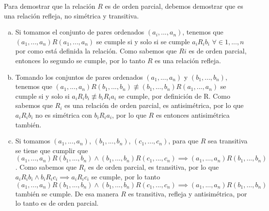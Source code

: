 
Para demostrar que la relación $R$ es de orden parcial, debemos demostrar que es una relación refleja, no simétrica y transitiva.

\begin{enumerate}[a)]
    \item Si tomamos el conjunto de pares ordenados $(a_i,...,a_n)$, tenemos que $(a_1,...,a_n)R(a_1,...,a_n)$ se cumple si y solo si se cumple $a_iR_ib_i$ $\forall \in 1,...,n $ por como está definida la relación. Como sabemos que $Ri$ es de orden parcial, entonces lo segundo se cumple, por lo tanto $R$ es una relación refleja.
    
    \item Tomando los conjuntos de pares ordenados $(a_1,...,a_n)$ y $(b_1,...,b_n)$, tenemos que \newline $(a_1,...,a_n) R (b_1,...,b_n) \not\equiv (b_1,...,b_n) R (a_1,...,a_n)$ se cumple si y solo si $a_i R_i b_i \not\equiv b_i R_i a_i$ se cumple, por definición de R. Como sabemos que $R_i$ es una relación de orden parcial, es antisimétrica, por lo que $a_i R_i b_i$ no es simétrica con $b_i R_i a_i$, por lo que $R$ es entonces antisimétrica también.
     
    \item Si tomamos $(a_1,...,a_n)$, $(b_1,...,b_n)$, $(c_1,...,c_n)$, para que $R$ sea transitiva se tiene que cumplir que $(a_1,...,a_n) R (b_1,...,b_n) \land (b_1,...,b_n) R (c_1,...,c_n) \implies (a_1,...,a_n) R (b_1,...,b_n)$. Como sabemos que $R_i$ es de orden parcial, es transitiva, por lo que $a_i R_i b_i \land b_i R_i c_i \implies a_i R_i c_i$ se cumple, por lo tanto $(a_1,...,a_n) R (b_1,...,b_n) \land (b_1,...,b_n) R (c_1,...,c_n) \implies (a_1,...,a_n) R (b_1,...,b_n)$ también se cumple. De esa manera $R$ es transitiva, refleja y antisimétrica, por lo tanto es de orden parcial.
\end{enumerate}

